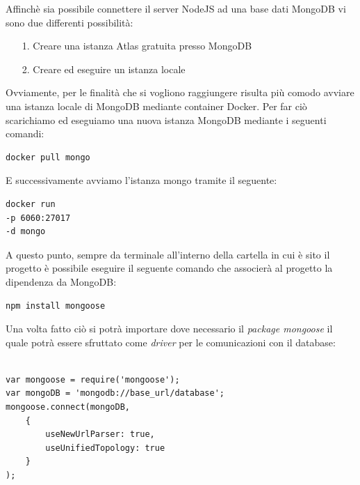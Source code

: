 \documentclass[twoside]{report}
\begin{document}
Affinchè sia possibile connettere il server NodeJS ad una base dati MongoDB vi sono due differenti possibilità:

\begin{itemize}
    \item[1.] Creare una istanza Atlas gratuita presso MongoDB
    \item[2.] Creare ed eseguire un istanza locale
\end{itemize}

Ovviamente, per le finalità che si vogliono raggiungere risulta più comodo avviare una istanza locale di MongoDB mediante container Docker.
\bigbreak
Per far ciò scarichiamo ed eseguiamo una nuova istanza MongoDB mediante i seguenti comandi:

\begin{listing}[h!]
\begin{verbatim}
docker pull mongo
\end{verbatim}
\end{listing}
\FloatBarrier

E successivamente avviamo l'istanza mongo tramite il seguente:
\begin{listing}[h!]
\begin{verbatim}
docker run 
-p 6060:27017 
-d mongo
\end{verbatim}
\end{listing}
\FloatBarrier


A questo punto, sempre da terminale all'interno della cartella in cui è sito il progetto è possibile eseguire il seguente comando che associerà al progetto la dipendenza da MongoDB:

\begin{listing}[h!]
\begin{verbatim}
npm install mongoose
\end{verbatim}
\end{listing}
\FloatBarrier

Una volta fatto ciò si potrà importare dove necessario il \textit{package mongoose} il quale potrà essere sfruttato come \textit{driver} per le comunicazioni con il database:

\begin{listing}[h!]
\begin{verbatim}

var mongoose = require('mongoose');
var mongoDB = 'mongodb://base_url/database';
mongoose.connect(mongoDB, 
    {
        useNewUrlParser: true,
        useUnifiedTopology: true
    }
);

\end{verbatim}
\end{listing}
\FloatBarrier
\end{document}
